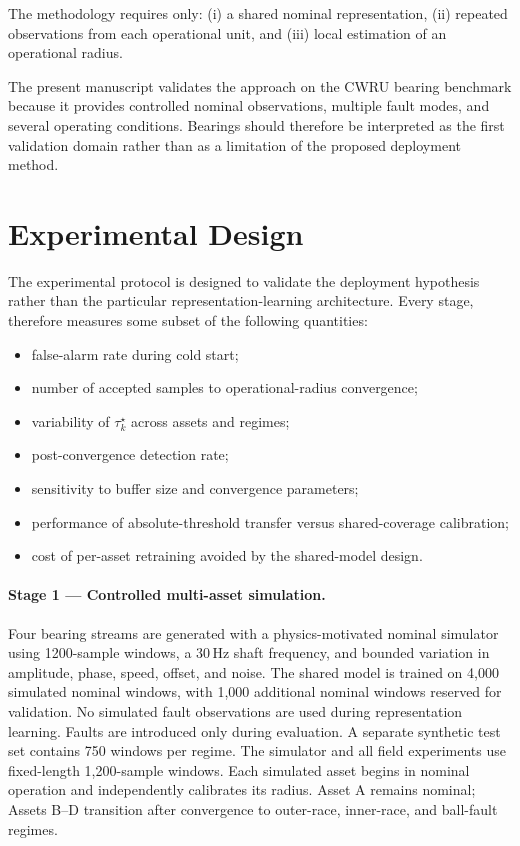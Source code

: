 \documentclass[11pt,a4paper]{article}
\begin{document}
The methodology requires only:
(i) a shared nominal representation,
(ii) repeated observations from each operational unit, and
(iii) local estimation of an operational radius.

The present manuscript validates the approach on the CWRU bearing benchmark because
it provides controlled nominal observations, multiple fault modes, and several operating
conditions. Bearings should therefore be interpreted as the first validation domain rather
than as a limitation of the proposed deployment method.

\section{Experimental Design}
\label{sec:expdesign}

The experimental protocol is designed to validate the deployment hypothesis rather than the particular representation-learning architecture.
Every stage, therefore measures some subset of the following quantities:

\begin{itemize}[leftmargin=1.5em]
    \item false-alarm rate during cold start;
    \item number of accepted samples to operational-radius convergence;
    \item variability of $\tau_k^\star$ across assets and regimes;
    \item post-convergence detection rate;
    \item sensitivity to buffer size and convergence parameters;
    \item performance of absolute-threshold transfer versus shared-coverage calibration;
    \item cost of per-asset retraining avoided by the shared-model design.
\end{itemize}

\paragraph{Stage 1 --- Controlled multi-asset simulation.}
Four bearing streams are generated with a physics-motivated nominal simulator using
1200-sample windows, a 30\,Hz shaft frequency, and bounded variation in amplitude, phase, speed,
offset, and noise. The shared model is trained on 4,000 simulated nominal windows, with 1,000 additional nominal
windows reserved for validation. 
No simulated fault observations are used during representation learning. Faults are introduced only during evaluation.
A separate synthetic test set contains 750 windows per regime.
The simulator and all field experiments use fixed-length 1,200-sample windows. Each simulated asset begins in nominal operation and independently calibrates its
radius. Asset A remains nominal; Assets B--D transition after convergence to outer-race,
inner-race, and ball-fault regimes.
\end{document}
